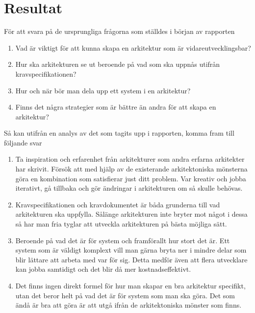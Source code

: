 \section{Resultat}
För att svara på de ursprungliga frågorna som ställdes i början av rapporten

\begin{enumerate}
	\item Vad är viktigt för att kunna skapa en arkitektur som är vidareutvecklingsbar?
	\item Hur ska arkitekturen se ut beroende på vad som ska uppnås utifrån kravspecifikationen?
	\item Hur och när bör man dela upp ett system i en arkitektur?
	\item Finns det några strategier som är bättre än andra för att skapa en arkitektur?
\end{enumerate}Så kan utifrån en analys av det som tagits upp i rapporten, komma fram till följande svar

\begin{enumerate}
	\item Ta inspiration och erfarenhet från arkitekturer som andra erfarna arkitekter har skrivit. Försök att med hjälp av de existerande arkitektoniska mönsterna göra en kombination som satisfierar just ditt problem. Var kreativ och jobba iterativt, gå tillbaka och gör ändringar i arkitekturen om så skulle behövas.
	\item Kravspecifikationen och kravdokumentet är båda grunderna till vad arkitekturen ska uppfylla. Sålänge arkitekturen inte bryter mot något i dessa så har man fria tyglar att utveckla arkitekturen på bästa möjliga sätt.
	\item Beroende på vad det är för system och framförallt hur stort det är. Ett system som är väldigt komplext vill man gärna bryta ner i mindre delar som blir lättare att arbeta med var för sig. Detta medför även att flera utvecklare kan jobba samtidigt och det blir då mer kostnadseffektivt.
	\item Det finns ingen direkt formel för hur man skapar en bra arkitektur specifikt, utan det beror helt på vad det är för system som man ska göra. Det som ändå är bra att göra är att utgå ifrån de arkitektoniska mönster som finns.
\end{enumerate}
